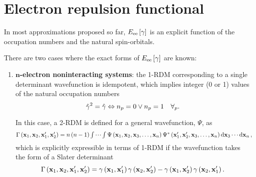 \section{Electron repulsion functional} %
\label{sub:Electron-electron functionals}

In most approximations proposed so far, $E_{\text{ee}} \left[ \gamma \right]$
is an explicit function of the occupation numbers and the natural spin-orbitals. 

There are two cases where the exact forms of $E_{\text{ee}} \left[ \gamma \right]$ are known:
\begin{enumerate}
    \item \textbf{$\boldsymbol{n}$-electron noninteracting systems}: the 1-RDM corresponding
        to a single determinant wavefunction is idempotent, which implies integer
        (0 or 1) values of the natural occupation numbers 
        \begin{equation}
            \hat{\gamma}^{2} = \hat{\gamma}
            \Leftrightarrow
            n_p = 0  \vee n_p = 1
            \quad \forall_{p}
            .
        \end{equation}

        In this case, a 2-RDM is defined for a general wavefunction, $\Psi$, as 
        \begin{equation}
            \resizebox{\textwidth}{!}{$
            \sordm \left( \mat{x}_1, \mat{x}_2, \mat{x}_1\myprime, \mat{x}_2\myprime \right)
            =
            n\left( n - 1 \right) \idotsint
            \Psi \left( \mat{x}_1, \mat{x}_2, \mat{x}_3, \ldots,  \mat{x}_n \right)
            \Psi^{*} \left( \mat{x}_1\myprime, \mat{x}_2\myprime, \mat{x}_3, \ldots,  \mat{x}_n \right)
            \dd{ \mat{x}_3} \cdots \dd{ \mat{x}_n}
            ,
        $}
        \end{equation}
        which is explicitly expressible in terms of 1-RDM if the wavefunction takes
        the form of a Slater determinant 
        \begin{equation} \label{eq:HF-approximation-sordm-1}
            \Gamma \left( \boldsymbol{\mathrm{x}}_1, \boldsymbol{\mathrm{x}}_2, \boldsymbol{\mathrm{x}}_1^{\prime}, \boldsymbol{\mathrm{x}}_2^{\prime} \right)
            = 
            \gamma \left( \boldsymbol{\mathrm{x}}_1, \boldsymbol{\mathrm{x}}_1^{\prime} \right)
            \gamma \left( \boldsymbol{\mathrm{x}}_2, \boldsymbol{\mathrm{x}}_2^{\prime} \right)
            -
            \gamma \left( \boldsymbol{\mathrm{x}}_1, \boldsymbol{\mathrm{x}}_2^{\prime} \right)
            \gamma \left( \boldsymbol{\mathrm{x}}_2, \boldsymbol{\mathrm{x}}_1^{\prime} \right)
            .
        \end{equation}


\end{enumerate}
